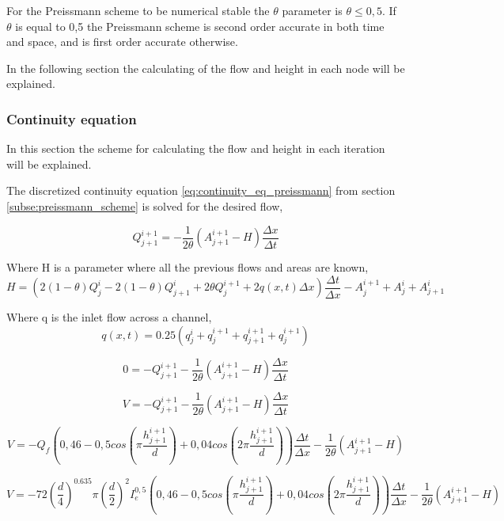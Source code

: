 For the Preissmann scheme to be numerical stable the $\theta$ parameter is $\theta \leq 0,5$. If $\theta$ is equal to 0,5 the Preissmann scheme is second order accurate in both time and space, and is first order accurate otherwise.   

In the following section the calculating of the flow and height in each node will be explained.

\subsubsection*{Continuity equation}
In this section the scheme for calculating the flow and height in each iteration will be explained. 

The discretized continuity equation \ref{eq:continuity_eq_preissmann} from section \ref{subse:preissmann_scheme} is solved for the desired flow,

\begin{equation}
	Q_{j+1}^{i+1} = - \frac{1}{2\theta}\left(A_{j+1}^{i+1}-H\right)\frac{\Delta x}{\Delta t}
\end{equation}

Where H is a parameter where all the previous flows and areas are known,
\begin{equation}
	H = \left(2(1-\theta)Q_j^i-2(1-\theta)Q_{j+1}^i+2\theta Q_j^{i+1}+2q(x,t)\Delta x\right)\frac{\Delta t}{\Delta x}- A_{j}^{i+1}+A_j^i+A_{j+1}^i
\end{equation}

Where q is the inlet flow across a channel,
\begin{equation}
	q(x,t) = 0.25(q_j^i+q_j^{i+1}+q_{j+1}^{i+1}+q_j^{i+1})	
\end{equation}



\begin{equation}
		0=-Q_{j+1}^{i+1}  - \frac{1}{2\theta}\left(A_{j+1}^{i+1}-H\right)\frac{\Delta x}{\Delta t}
\end{equation}

\begin{equation}
		V=-Q_{j+1}^{i+1}  - \frac{1}{2\theta}\left(A_{j+1}^{i+1}-H\right)\frac{\Delta x}{\Delta t}
\end{equation}

\begin{equation}
	V = -Q_f\left(0,46-0,5cos\left(\pi \frac{h_{j+1}^{i+1}}{d}\right)+0,04cos\left(2\pi\frac{h_{j+1}^{i+1}}{d}\right)\right)\frac{\Delta t}{\Delta x}-\frac{1}{2\theta}\left(A_{j+1}^{i+1}-H\right)
\end{equation}

\begin{equation}
	V = -72\left(\frac{d}{4}\right)^{0.635}\pi\left(\frac{d}{2}\right)^2I_e^{0,5}\left(0,46-0,5cos\left(\pi \frac{h_{j+1}^{i+1}}{d}\right)+0,04cos\left(2\pi\frac{h_{j+1}^{i+1}}{d}\right)\right)\frac{\Delta t}{\Delta x}-\frac{1}{2\theta}\left(A_{j+1}^{i+1}-H\right)
\end{equation}

